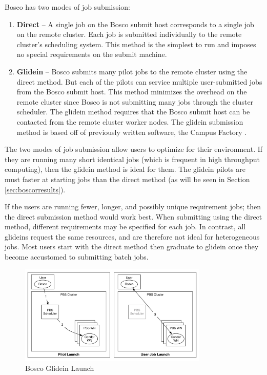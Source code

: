 Bosco has two modes of job submission:
\begin{enumerate}
	\item \textbf{Direct} -- A single job on the Bosco submit host corresponds to a single job on the remote cluster.  Each job is submitted individually to the remote cluster's scheduling system.  This method is the simplest to run and imposes no special requirements on the submit machine.
	
	\item \textbf{Glidein} -- Bosco submits many pilot jobs to the remote cluster using the direct method.  But each of the pilots can service multiple user-submitted jobs from the Bosco submit host.  This method minimizes the overhead on the remote cluster since Bosco is not submitting many jobs through the cluster scheduler.  The glidein method requires that the Bosco submit host can be contacted from the remote cluster worker nodes. \label{sec:glidein}  The glidein submission method is based off of previously written software, the Campus Factory \cite{weitzel2011campus}.
\end{enumerate}

The two modes of job submission allow users to optimize for their environment.  If they are running many short identical jobs (which is frequent in high throughput computing), then the glidein method is ideal for them.  The glidein pilots are must faster at starting jobs than the direct method (as will be seen in Section \ref{sec:boscorresults}).

If the users are running fewer, longer, and possibly unique requirement jobs; then the direct submission method would work best.  When submitting using the direct method, different requirements may be specified for each job.  In contrast, all glideins request the same resources, and are therefore not ideal for heterogeneous jobs.  Most users start with the direct method then graduate to glidein once they become accustomed to submitting batch jobs.

\begin{figure}[h!t]
	\centering
	\includegraphics[width=0.8\textwidth]{images/BoscoGlideinLaunch.pdf}
	\caption{Bosco Glidein Launch}
	\label{fig:boscoglideinlaunch}
\end{figure}

